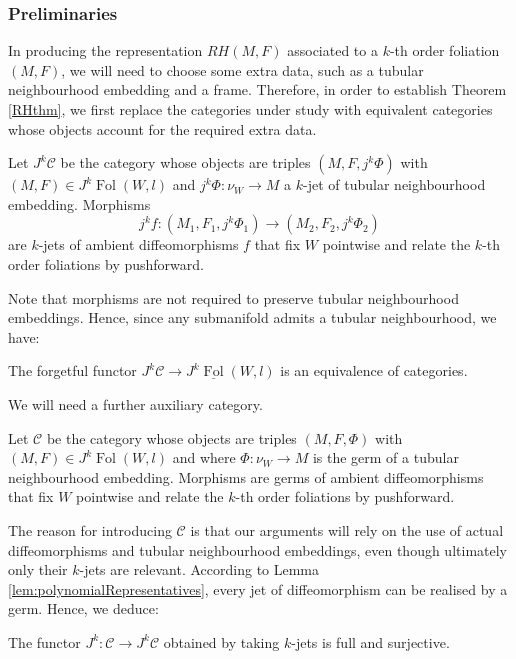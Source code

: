 \documentclass[10pt]{amsart}
\newcommand{\FolCat}{{\underline{\operatorname{Fol}}}}
\newcommand{\FolObj}{{\operatorname{Fol}}}
\newcommand{\C}{\mathcal{C}}
\numberwithin{theoremalpha}{section}
\numberwithin{equation}{section}
\numberwithin{definition}{section}
\numberwithin{theorem}{section}
\numberwithin{proposition}{section}
\numberwithin{lemma}{section}
\numberwithin{example}{section}
\numberwithin{remark}{section}
\numberwithin{corollary}{section}
\numberwithin{question}{section}
\numberwithin{problem}{section}
\numberwithin{assumption}{section}
\theoremstyle{named}
\numberwithin{equation}{section}
\begin{document}
\subsubsection{Preliminaries}
In producing the representation $RH(M,F)$ associated to a $k$-th order foliation $(M,F)$, we will need to choose some extra data, such as a tubular neighbourhood embedding and a frame. Therefore, in order to establish Theorem \ref{RHthm}, we first replace the categories under study with equivalent categories whose objects account for the required extra data.

\begin{definition}\label{definitionofJkC}
Let $J^k\mathcal{C}$ be the category whose objects are triples $(M, F, j^k\Phi)$ with $(M,F)\in J^k\FolObj(W,l)$ and $j^k\Phi: \nu_{W} \to M$ a $k$-jet of tubular neighbourhood embedding. Morphisms
\begin{equation*}
j^kf : (M_1,F_1,j^k\Phi_1) \rightarrow (M_2,F_2,j^k\Phi_2) 
\end{equation*}
are $k$-jets of ambient diffeomorphisms $f$ that fix $W$ pointwise and relate the $k$-th order foliations by pushforward.
\end{definition}
Note that morphisms are not required to preserve tubular neighbourhood embeddings. Hence, since any submanifold admits a tubular neighbourhood, we have:
\begin{lemma}
The forgetful functor $J^k\mathcal{C} \to J^{k}\FolCat(W,l)$ is an equivalence of categories.
\end{lemma}

We will need a further auxiliary category. 
\begin{definition} \label{definitionofC}
Let $\mathcal{C}$ be the category whose objects are triples $(M, F, \Phi)$ with $(M,F)\in J^k\FolObj(W,l)$ and where $\Phi: \nu_{W} \to M$ is the germ of a tubular neighbourhood embedding. Morphisms are germs of ambient diffeomorphisms that fix $W$ pointwise and relate the $k$-th order foliations by pushforward. 
\end{definition}
The reason for introducing $\mathcal{C}$ is that our arguments will rely on the use of actual diffeomorphisms and tubular neighbourhood embeddings, even though ultimately only their $k$-jets are relevant. According to Lemma \ref{lem:polynomialRepresentatives}, every jet of diffeomorphism can be realised by a germ. Hence, we deduce:
\begin{lemma}
The functor $J^k : \C \rightarrow J^k\C$ obtained by taking $k$-jets is full and surjective.
\end{lemma}
\end{document}

